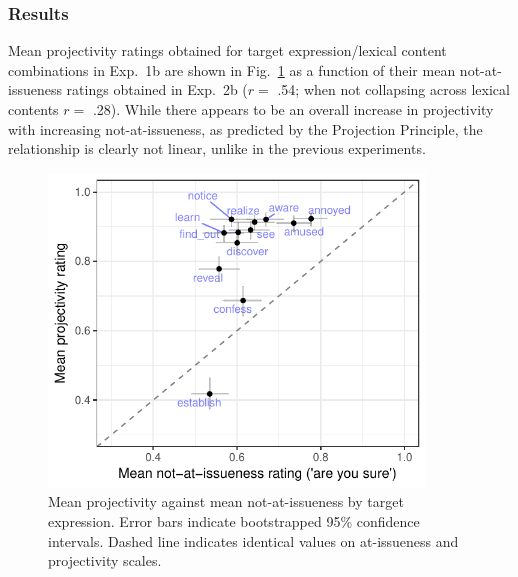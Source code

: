 \documentclass[11pt,fleqn]{article}
\newcommand{\6}{\mbox{$[\hspace*{-.6mm}[$}}
\newcommand{\9}{\mbox{$]\hspace*{-.6mm}]$}}
\newcommand{\figref}[1]{Fig.~\ref{#1}}
\begin{document}
\subsubsection{Results}

Mean projectivity ratings obtained for target expression/lexical content combinations in Exp.~1b are shown in \figref{fig:f-proj-ai-2b} as a function of their mean not-at-issueness ratings obtained in Exp.~2b ($r =$ .54; when not collapsing across lexical contents $r =$ .28). While there appears to be an overall increase in projectivity with increasing not-at-issueness, as predicted by the Projection Principle, the relationship is clearly not linear, unlike in the previous experiments.

\begin{figure}[!h]

\begin{center}
\includegraphics[width=10cm]{../results/exp2b/graphs/ai-proj-bytrigger-labels}
\end{center}

\caption{Mean projectivity against mean not-at-issueness by target expression. Error bars indicate bootstrapped 95\% confidence intervals. Dashed line indicates identical values on at-issueness and projectivity scales.}
\label{fig:f-proj-ai-2b}
\end{figure}


%
%
%
%
%
\end{document}
